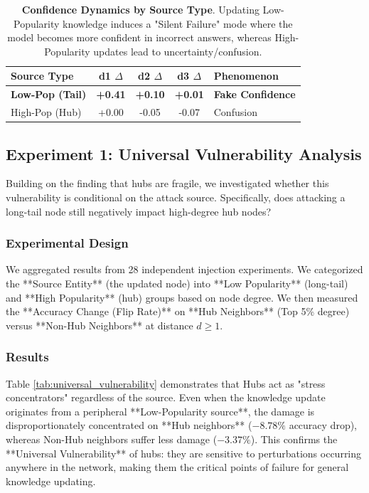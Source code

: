 \begin{table}[h]
\centering
\small
\begin{tabular}{l|ccc|l}
\toprule
\textbf{Source Type} & \textbf{d1 $\Delta$} & \textbf{d2 $\Delta$} & \textbf{d3 $\Delta$} & \textbf{Phenomenon} \\
\midrule
\textbf{Low-Pop (Tail)} & \textbf{+0.41} & \textbf{+0.10} & \textbf{+0.01} & \textbf{Fake Confidence} \\
High-Pop (Hub) & +0.00 & -0.05 & -0.07 & Confusion \\
\bottomrule
\end{tabular}
\caption{\label{tab:confidence_dynamics} \textbf{Confidence Dynamics by Source Type}. Updating Low-Popularity knowledge induces a "Silent Failure" mode where the model becomes more confident in incorrect answers, whereas High-Popularity updates lead to uncertainty/confusion.}
\end{table}

\subsection{Experiment 1: Universal Vulnerability Analysis}

Building on the finding that hubs are fragile, we investigated whether this vulnerability is conditional on the attack source. Specifically, does attacking a long-tail node still negatively impact high-degree hub nodes?

\subsubsection{Experimental Design}
We aggregated results from 28 independent injection experiments. We categorized the **Source Entity** (the updated node) into **Low Popularity** (long-tail) and **High Popularity** (hub) groups based on node degree. We then measured the **Accuracy Change (Flip Rate)** on **Hub Neighbors** (Top 5\% degree) versus **Non-Hub Neighbors** at distance $d \ge 1$.

\subsubsection{Results}
Table \ref{tab:universal_vulnerability} demonstrates that Hubs act as "stress concentrators" regardless of the source. Even when the knowledge update originates from a peripheral **Low-Popularity source**, the damage is disproportionately concentrated on **Hub neighbors** ($-8.78\%$ accuracy drop), whereas Non-Hub neighbors suffer less damage ($-3.37\%$). This confirms the **Universal Vulnerability** of hubs: they are sensitive to perturbations occurring anywhere in the network, making them the critical points of failure for general knowledge updating.

